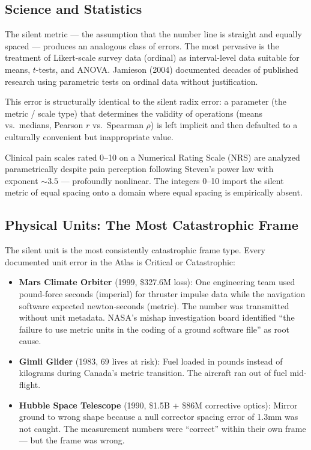 \documentclass[12pt,a4paper]{article}
\theoremstyle{definition}
\theoremstyle{remark}
\begin{document}
\subsection{Science and Statistics}

The silent metric --- the assumption that the number line is straight and equally
spaced --- produces an analogous class of errors. The most pervasive is the
treatment of Likert-scale survey data (ordinal) as interval-level data suitable for
means, $t$-tests, and ANOVA. Jamieson (2004) documented decades of published
research using parametric tests on ordinal data without justification.

This error is structurally identical to the silent radix error: a parameter (the
metric / scale type) that determines the validity of operations (means vs.\
medians, Pearson $r$ vs.\ Spearman $\rho$) is left implicit and then defaulted to
a culturally convenient but inappropriate value.

Clinical pain scales rated 0--10 on a Numerical Rating Scale (NRS) are analyzed
parametrically despite pain perception following Steven's power law with exponent
$\sim\!3.5$ --- profoundly nonlinear. The integers 0--10 import the silent metric
of equal spacing onto a domain where equal spacing is empirically absent.

\subsection{Physical Units: The Most Catastrophic Frame}

The silent unit is the most consistently catastrophic frame type. Every documented
unit error in the Atlas is Critical or Catastrophic:

\begin{itemize}[nosep]
  \item \textbf{Mars Climate Orbiter} (1999, \$327.6M loss): One engineering team
        used pound-force seconds (imperial) for thruster impulse data while the
        navigation software expected newton-seconds (metric). The number was
        transmitted without unit metadata. NASA's mishap investigation board
        identified ``the failure to use metric units in the coding of a ground
        software file'' as root cause.
  \item \textbf{Gimli Glider} (1983, 69 lives at risk): Fuel loaded in pounds
        instead of kilograms during Canada's metric transition. The aircraft ran out
        of fuel mid-flight.
  \item \textbf{Hubble Space Telescope} (1990, \$1.5B + \$86M corrective optics):
        Mirror ground to wrong shape because a null corrector spacing error of
        1.3mm was not caught. The measurement numbers were ``correct'' within their
        own frame --- but the frame was wrong.
\end{itemize}
\end{document}
